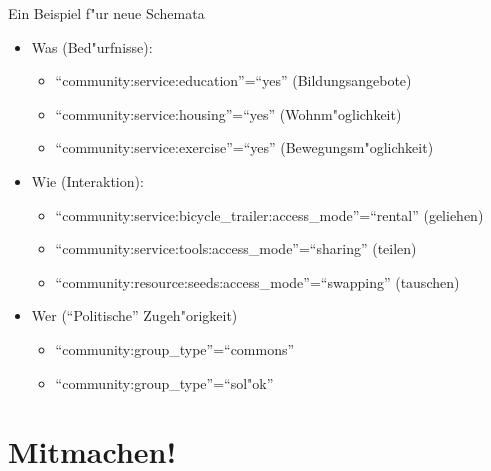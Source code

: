 \documentclass{beamer}
\begin{document}
\begin{frame}{Ein Beispiel f"ur neue Schemata}

\begin{itemize}
	\item Was (Bed"urfnisse):
	\begin{itemize}
		\item ``community:service:education''=``yes'' (Bildungsangebote)
		\item ``community:service:housing''=``yes'' (Wohnm"oglichkeit)
		\item ``community:service:exercise''=``yes'' (Bewegungsm"oglichkeit)
	\end{itemize}
\end{itemize}

\pause
\begin{itemize}
	\item Wie (Interaktion):
	\begin{itemize}
		\item ``community:service:bicycle\_trailer:access\_mode''=``rental'' (geliehen)
		\item ``community:service:tools:access\_mode''=``sharing'' (teilen)
		\item ``community:resource:seeds:access\_mode''=``swapping'' (tauschen)
	\end{itemize}
\end{itemize}
\pause
\begin{itemize}
	\item Wer ("`Politische"' Zugeh"origkeit)
	\begin{itemize}
		\item ``community:group\_type''=``commons'' 
		\item ``community:group\_type''=``sol"ok'' 
	\end{itemize}
\end{itemize}

\end{frame}


\section{Mitmachen!}

\end{document}
